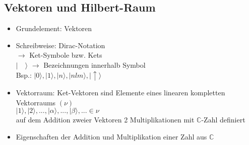 \documentclass[10pt,article,colorback,accentcolor=tud9d]{scrartcl}
\begin{document}
\subsection{Vektoren und Hilbert-Raum}
\begin{itemize}
\item Grundelement: Vektoren
\item Schreibweise: Dirac-Notation\\
$\rightarrow$ Ket-Symbole bzw. Kets\\
$\left| \quad \rangle  \right.$ $\rightarrow$ Bezeichnungen innerhalb Symbol\\
Bsp.: $\left| 0\rangle \right.,\left|1\rangle \right.,\left|n\rangle \right.,\left|nlm\rangle \right.,
\left| \uparrow\rangle \right.$
\item Vektorraum: Ket-Vektoren sind Elemente eines linearen kompletten 
Vektorraums $(\nu)$\\
$\left|1\rangle \right.,\left|2\rangle \right.,...,\left|\alpha\rangle \right.,...,\left|\beta\rangle 
\right.,... \in \nu$\\
auf dem Addition zweier Vektoren 2 Multiplikationen mit $\mathbb{C}$-Zahl 
definiert
\item Eigenschaften der Addition und Multiplikation einer Zahl aus $\mathbb{C}$
 

\end{itemize}
\end{document}
